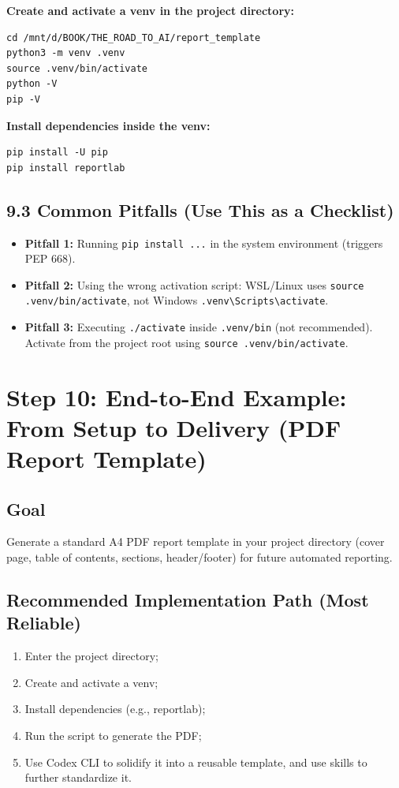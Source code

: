 \documentclass[11pt,a4paper]{article}
\begin{document}
\textbf{Create and activate a venv in the project directory:}
\begin{lstlisting}
cd /mnt/d/BOOK/THE_ROAD_TO_AI/report_template
python3 -m venv .venv
source .venv/bin/activate
python -V
pip -V
\end{lstlisting}

\textbf{Install dependencies inside the venv:}
\begin{lstlisting}
pip install -U pip
pip install reportlab
\end{lstlisting}

\subsection{9.3 Common Pitfalls (Use This as a Checklist)}
\begin{itemize}[leftmargin=1.5em]
  \item \textbf{Pitfall 1:} Running \texttt{pip install ...} in the system environment (triggers PEP 668).
  \item \textbf{Pitfall 2:} Using the wrong activation script: WSL/Linux uses \texttt{source .venv/bin/activate}, not Windows \texttt{.venv\textbackslash Scripts\textbackslash activate}.
  \item \textbf{Pitfall 3:} Executing \texttt{./activate} inside \texttt{.venv/bin} (not recommended). Activate from the project root using \texttt{source .venv/bin/activate}.
\end{itemize}

\section{Step 10: End-to-End Example: From Setup to Delivery (PDF Report Template)}
\subsection{Goal}
Generate a standard A4 PDF report template in your project directory (cover page, table of contents, sections, header/footer) for future automated reporting.

\subsection{Recommended Implementation Path (Most Reliable)}
\begin{enumerate}[leftmargin=1.7em]
  \item Enter the project directory;
  \item Create and activate a venv;
  \item Install dependencies (e.g., reportlab);
  \item Run the script to generate the PDF;
  \item Use Codex CLI to solidify it into a reusable template, and use skills to further standardize it.
\end{enumerate}
\end{document}
